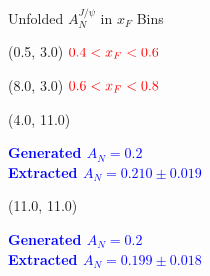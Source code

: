 \documentclass[10pt, xcolor={dvipsnames}, aspectratio = 169]{beamer}
\begin{document}
\begin{frame}{Unfolded $A^{J/\psi}_{N}$ in $x_{F}$ Bins}
\begin{textblock}{3.0}(0.5, 3.0)
$\color{red} 0.4 < x_{F} < 0.6$
\end{textblock}

\begin{textblock}{3.0}(8.0, 3.0)
$\color{red} 0.6 < x_{F} < 0.8$
\end{textblock}

\begin{textblock}{5.0}(4.0, 11.0)
\begin{small}
\textcolor{blue}{\textbf{Generated $A_{N} = 0.2$ \\
Extracted $A_{N} = 0.210 \pm 0.019$}}
\end{small}
\end{textblock}

\begin{textblock}{5.0}(11.0, 11.0)
\begin{small}
\textcolor{blue}{\textbf{Generated $A_{N} = 0.2$ \\
Extracted $A_{N} = 0.199 \pm 0.018$}}
\end{small}
\end{textblock}

\end{frame}
\end{document}
